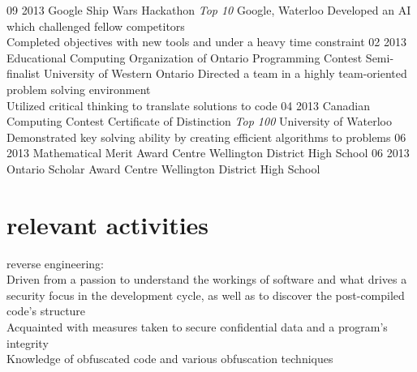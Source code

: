 \documentclass[]{friggeri-cv}
\begin{document}
\begin{entrylist}
  \entry
  	{09 2013}
  	{Google Ship Wars Hackathon \textsf{\em{Top 10}}}
  	{Google, Waterloo}
  	{Developed an AI which challenged fellow competitors \\
  	 Completed objectives with new tools and under a heavy time constraint}
  \entry
  	{02 2013}
  	{Educational Computing Organization of Ontario Programming Contest Semi-finalist}
  	{University of Western Ontario}
  	{Directed a team in a highly team-oriented problem solving environment \\
  	 Utilized critical thinking to translate solutions to code}
  \entry
	{04 2013}  	
  	{Canadian Computing Contest Certificate of Distinction \textsf{\em{Top 100}}}
  	{University of Waterloo}
  	{Demonstrated key solving ability by creating efficient algorithms to problems}
  \entry
  	{06 2013}
  	{Mathematical Merit Award}
  	{Centre Wellington District High School}
  	{}
  \entry
  	{06 2013}
  	{Ontario Scholar Award}
  	{Centre Wellington District High School}
  	{}

\end{entrylist}

\section{relevant activities}
reverse engineering:\\
Driven from a passion to understand the workings of software and what drives a security focus in the development cycle, as well as to discover the post-compiled code's structure \\
Acquainted with measures taken to secure confidential data and a program's integrity \\
Knowledge of obfuscated code and various obfuscation techniques
\end{document}

